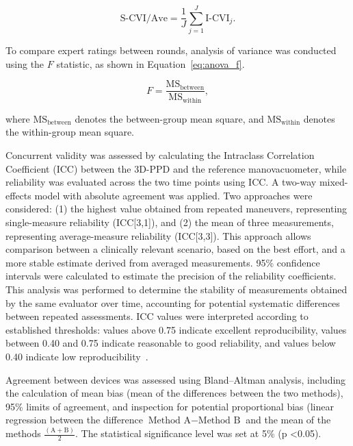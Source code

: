 \documentclass{ieeeaccess}
\begin{document}
\begin{equation}
  \mathrm{S\mbox{-}CVI/Ave} = \frac{1}{J}\sum_{j=1}^{J}\mathrm{I\mbox{-}CVI}_j.
  \label{eq:scvi_ave}
\end{equation}

To compare expert ratings between rounds, analysis of variance was conducted using the \ensuremath{F} statistic, as shown in Equation~\eqref{eq:anova_f}.

\begin{equation}
  F = \frac{\mathrm{MS}_{\mathrm{between}}}{\mathrm{MS}_{\mathrm{within}}},
  \label{eq:anova_f}
\end{equation}

\noindent where \ensuremath{\mathrm{MS}_{\mathrm{between}}} denotes the between-group mean square, and \ensuremath{\mathrm{MS}_{\mathrm{within}}} denotes the within-group mean square.

Concurrent validity was assessed by calculating the Intraclass Correlation Coefficient (ICC) between the 3D-PPD and the reference manovacuometer, while reliability was evaluated across the two time points using ICC. {A two-way mixed-effects model with absolute agreement was applied. Two approaches were considered: (1) the highest value obtained from repeated maneuvers, representing single-measure reliability (ICC[3,1]), and (2) the mean of three measurements, representing average-measure reliability (ICC[3,3]). This approach allows comparison between a clinically relevant scenario, based on the best effort, and a more stable estimate derived from averaged measurements. 95\% confidence intervals were calculated to estimate the precision of the reliability coefficients. This analysis was performed to determine the stability of measurements obtained by the same evaluator over time, accounting for potential systematic differences between repeated assessments.} ICC values were interpreted according to established thresholds: values above 0.75 indicate excellent reproducibility, values between 0.40 and 0.75 indicate reasonable to good reliability, and values below 0.40 indicate low reproducibility~\cite{Shrout1979}. 

{Agreement between devices was assessed using Bland–Altman analysis, including the calculation of mean bias (mean of the differences between the two methods), 95\% limits of agreement, and inspection for potential proportional bias (linear regression between the difference \mbox{\ensuremath{\text{Method A} - \text{Method B}}} and the mean of the methods \mbox{$\frac{(\text{A} + \text{B})}{2}$}.}
The statistical significance level was set at 5\% (p \textless 0.05).
\end{document}
